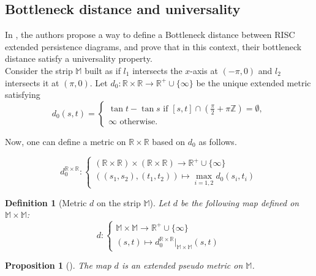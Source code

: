\documentclass[11pt]{article}
\newtheorem{proposition}[theorem]{Proposition}
\newtheorem{definition}[theorem]{Definition}
\theoremstyle{remark}
\newcommand{\Z}{\mathbb{Z}}
\newcommand{\R}{\mathbb{R}}
\newcommand{\M}{\mathbb{M}}
\begin{document}
\subsection{Bottleneck distance and universality}

In \cite{bauer2020universality}, the authors propose a way to define a Bottleneck distance between RISC extended persistence diagrams, and prove that in this context, their bottleneck distance satisfy a universality property. \\

\noindent Consider the strip $\M$ built as if $l_1$ intersects the $x$-axis at $(-\pi,0)$ and $l_2$ intersects it at $(\pi,0)$. Let $d_0:\R\times\R\rightarrow\R^+\cup\{\infty\}$ be the unique extended metric satisfying 
\begin{equation*}
    d_0(s,t)=
    \begin{cases}
    \tan t - \tan s \text{ if } [s,t]\cap (\frac{\pi}{2}+\pi\Z)=\emptyset,\\
    \infty \text{ otherwise.}
    \end{cases}
\end{equation*} 

\noindent Now, one can define a metric on $\R\times\R$ based on $d_0$ as follows. 

\begin{equation*}
    d_0^{\R\times\R}:
    \begin{cases}
    (\R\times\R)\times (\R\times\R)\rightarrow \R^+\cup\{\infty\}\\
    ((s_1,s_2),(t_1,t_2))\mapsto \max_{i=1,2} d_0(s_i,t_i)
    \end{cases}
\end{equation*}

\begin{definition}[Metric $d$ on the strip $\M$]
Let $d$ be the following map defined  on $\M\times \M$:
\begin{equation*}
d:\begin{cases}
\M\times\M\rightarrow\R^+\cup\{\infty\}\\
(s,t)\mapsto d_0^{\R\times\R}|_{\M\times\M}(s,t)
\end{cases}
\end{equation*}
\end{definition}

\begin{proposition}[\cite{bauer2020universality}]
The map $d$ is an extended pseudo metric on $\M$.
\end{proposition}
\end{document}
